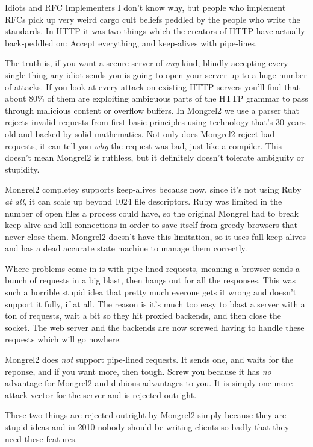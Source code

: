 \begin{aside}{Idiots and RFC Implementers}
I don't know why, but people who implement RFCs pick up very weird cargo cult
beliefs peddled by the people who write the standards.  In HTTP it was two things
which the creators of HTTP have actually back-peddled on:  Accept everything, and
keep-alives with pipe-lines.

The truth is, if you want a secure server of \emph{any} kind, blindly accepting
every single thing any idiot sends you is going to open your server up to a
huge number of attacks.  If you look at every attack on existing HTTP servers
you'll find that about 80\% of them are exploiting ambiguous parts of the HTTP
grammar to pass through malicious content or overflow buffers.  In Mongrel2 we
use a parser that rejects invalid requests from first basic principles using
technology that's 30 years old and backed by solid mathematics.  Not only does
Mongrel2 reject bad requests, it can tell you \emph{why} the request was
bad, just like a compiler.  This doesn't mean Mongrel2 is ruthless, but it
definitely doesn't tolerate ambiguity or stupidity.

Mongrel2 completey supports keep-alives because now, since it's not using Ruby
\emph{at all}, it can scale up beyond 1024 file descriptors.  Ruby was limited
in the number of open files a process could have, so the original Mongrel had
to break keep-alive and kill connections in order to save itself from greedy
browsers that never close them.  Mongrel2 doesn't have this limitation, so it
uses full keep-alives and has a dead accurate state machine to manage them correctly.

Where problems come in is with pipe-lined requests, meaning a browser sends a bunch
of requests in a big blast, then hangs out for all the responses.  This was such a
horrible stupid idea that pretty much everone gets it wrong and doesn't support it
fully, if at all.  The reason is it's much too easy to blast a server with a ton
of requests, wait a bit so they hit proxied backends, and then close the socket.  The
web server and the backends are now screwed having to handle these requests which will
go nowhere.

Mongrel2 does \emph{not} support pipe-lined requests.  It sends one, and waits for the
reponse, and if you want more, then tough.  Screw you because it has \emph{no} advantage
for Mongrel2 and dubious advantages to you.  It is simply one more attack vector for
the server and is rejected outright.

These two things are rejected outright by Mongrel2 simply because they are stupid ideas
and in 2010 nobody should be writing clients so badly that they need these features.
\end{aside}

